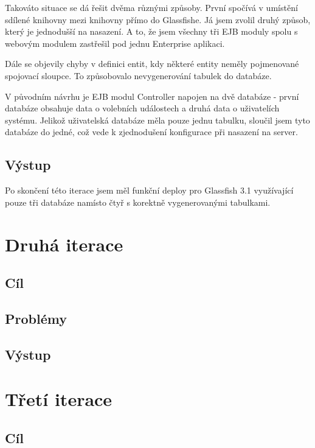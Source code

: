 \documentclass[11pt,twoside,a4paper]{book}
\begin{document}
Takováto situace se dá řešit dvěma různými způsoby. První spočívá v umístění sdílené knihovny mezi knihovny přímo do Glassfishe. Já jsem zvolil druhý způsob, který je jednodušší na nasazení. A to, že jsem všechny tři EJB moduly spolu s webovým modulem zastřešil pod jednu Enterprise aplikaci. 

Dále se objevily chyby v definici entit, kdy některé entity neměly pojmenované spojovací sloupce. To způsobovalo nevygenerování tabulek do databáze.

V původním návrhu je EJB modul Controller napojen na dvě databáze - první databáze obsahuje data o volebních událostech a druhá data o uživatelích systému. Jelikož uživatelská databáze měla pouze jednu tabulku, sloučil jsem tyto databáze do jedné, což vede k zjednodušení konfigurace při nasazení na server.

\subsection{Výstup}

Po skončení této iterace jsem měl funkční deploy pro Glassfish 3.1 využívající pouze tři databáze namísto čtyř s korektně vygenerovanými tabulkami.


\section{Druhá iterace}

\subsection{Cíl}

\subsection{Problémy}

\subsection{Výstup}

\section{Třetí iterace}

\subsection{Cíl}
\end{document}
